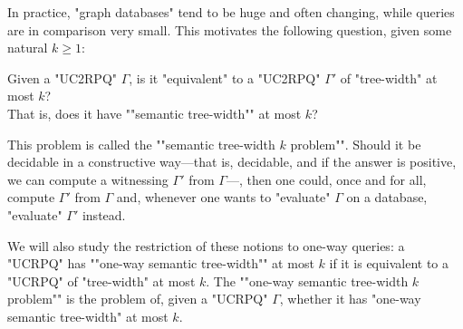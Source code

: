 In practice, "graph databases" tend to be huge and often changing, while queries
are in comparison very small.
This motivates the following question, given some natural $k \geq 1$: 

\begin{center}
    \AP 
    Given a "UC2RPQ" $\Gamma$, is it "equivalent" to a "UC2RPQ" $\Gamma'$ of "tree-width" at most $k$?\\
    That is, does it have ""semantic tree-width"" at most $k$?
\end{center}
This problem is called the ""semantic tree-width $k$ problem"".
Should it be decidable in a constructive way---that is, decidable, and if the answer is positive, we can compute a witnessing $\Gamma'$ from $\Gamma$---, then one could, once and for all,
compute $\Gamma'$ from $\Gamma$ and, whenever one wants to "evaluate" $\Gamma$ on a
database, "evaluate" $\Gamma'$ instead.

We will also study the restriction of these notions to one-way queries: a "UCRPQ" has \AP""one-way semantic tree-width"" at most $k$ if it is equivalent to a "UCRPQ" of "tree-width" at most $k$. The \AP""one-way semantic tree-width $k$ problem"" is the problem of, given a "UCRPQ" $\Gamma$, whether it has "one-way semantic tree-width" at most $k$.

